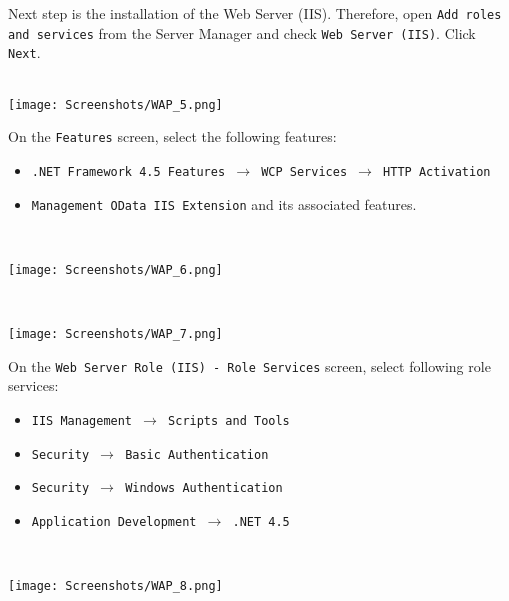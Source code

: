 \clearpage

Next step is the installation of the Web Server (IIS). Therefore, open \texttt{Add roles and services} from the Server Manager and check \texttt{Web Server (IIS)}. Click \texttt{Next}.
$\;$ \\ \\
\noindent\begin{minipage}{\textwidth}
    \centering
    \texttt{[image: Screenshots/WAP\_5.png]}
\end{minipage}

\clearpage

On the \texttt{Features} screen, select the following features:
\begin{itemize}
\item \texttt{.NET Framework 4.5 Features $\rightarrow$ WCP Services $\rightarrow$ HTTP Activation}
\item \texttt{Management OData IIS Extension} and its associated features.
\end{itemize}
$\;$ \\ \\
\noindent\begin{minipage}{\textwidth}
    \centering
    \texttt{[image: Screenshots/WAP\_6.png]}
\end{minipage}
$\;$ \\ \\
\noindent\begin{minipage}{\textwidth}
    \centering
    \texttt{[image: Screenshots/WAP\_7.png]}
\end{minipage}

\clearpage

On the \texttt{Web Server Role (IIS) - Role Services} screen, select following role services:
\begin{itemize}
\item \texttt{IIS Management $\rightarrow$ Scripts and Tools}
\item \texttt{Security $\rightarrow$ Basic Authentication}
\item \texttt{Security $\rightarrow$ Windows Authentication}
\item \texttt{Application Development $\rightarrow$ .NET 4.5}
\end{itemize}
$\;$ \\ \\
\noindent\begin{minipage}{\textwidth}
    \centering
    \texttt{[image: Screenshots/WAP\_8.png]}
\end{minipage}

